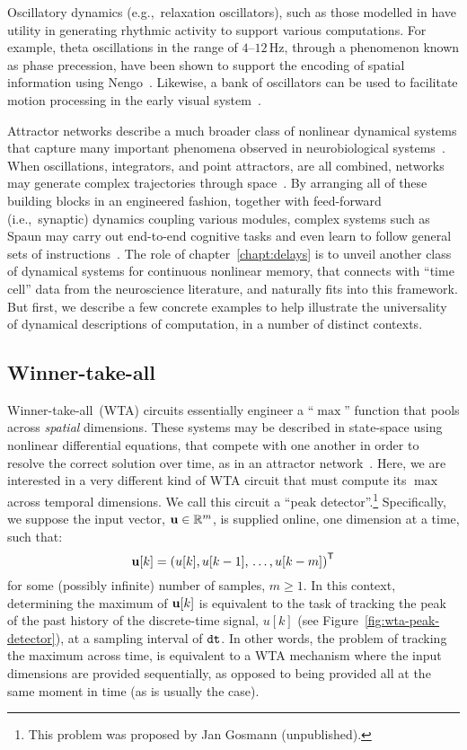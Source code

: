 Oscillatory dynamics (e.g.,~relaxation oscillators), such as those modelled in \citet{eliasmith2000b} have utility in generating rhythmic activity to support various computations.
For example, theta oscillations in the range of $4$--$12$\,Hz, through a phenomenon known as phase precession, have been shown to support the encoding of spatial information using Nengo~\citep{o1993phase, orchard2013does}.
Likewise, a bank of oscillators can be used to facilitate motion processing in the early visual system~\citep{huzook2012}. 

Attractor networks describe a much broader class of nonlinear dynamical systems that capture many important phenomena observed in neurobiological systems~\citep{amit1989modeling, eliasmith2005b}.
When oscillations, integrators, and point attractors, are all combined, networks may generate complex trajectories through space~\citep{ijspeert2013dynamical, dewolf2017}.
By arranging all of these building blocks in an engineered fashion, together with feed-forward (i.e.,~synaptic) dynamics coupling various modules, complex systems such as Spaun may carry out end-to-end cognitive tasks and even learn to follow general sets of instructions~\citep{eliasmith2012, choo2018}.
The role of chapter~\ref{chapt:delays} is to unveil another class of dynamical systems for continuous nonlinear memory, that connects with ``time cell'' data from the neuroscience literature, and naturally fits into this framework.
But first, we describe a few concrete examples to help illustrate the universality of dynamical descriptions of computation, in a number of distinct contexts.

\subsection{Winner-take-all}

Winner-take-all~(WTA) circuits essentially engineer a ``$\max$'' function that pools across \emph{spatial} dimensions.
These systems may be described in state-space using nonlinear differential equations, that compete with one another in order to resolve the correct solution over time, as in an attractor network~\citep{usher2001time, gosmann2017a}.
Here, we are interested in a very different kind of WTA circuit that must compute its $\max$ across temporal dimensions.
We call this circuit a ``peak detector''.\footnote{%
This problem was proposed by Jan Gosmann (unpublished).}
Specifically, we suppose the input vector, $\mathbf{u} \in \mathbb{R}^m$, is supplied online, one dimension at a time, such that:
$$\mathbf{u}[k] = {\left( u[k] \text{,}\, u[k-1] \text{,}\, \ldots \text{,}\, u[k-m] \right)}^\mathsf{T}$$
for some (possibly infinite) number of samples, $m \ge 1$.
In this context, determining the maximum of $\mathbf{u}[k]$ is equivalent to the task of tracking the peak of the past history of the discrete-time signal, $u[k]$ (see Figure~\ref{fig:wta-peak-detector}), at a sampling interval of $\texttt{dt}{}$.
In other words, the problem of tracking the maximum across time, is equivalent to a WTA mechanism where the input dimensions are provided sequentially, as opposed to being provided all at the same moment in time (as is usually the case).

